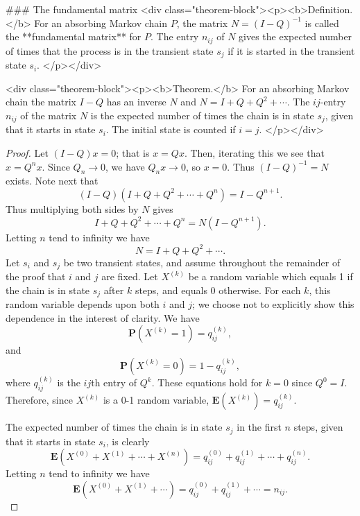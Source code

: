 ### The fundamental matrix
<div class="theorem-block"><p><b>Definition.</b> 
For an absorbing Markov chain $P$, the matrix $N = (I-Q)^{-1}$ is called the **fundamental matrix** for $P$. The entry $n_{ij}$ of $N$ gives the expected number of times that the process is in the transient state $s_j$ if it is started in the transient state $s_i$.
</p></div>

<div class="theorem-block"><p><b>Theorem.</b> 
For an absorbing Markov chain the matrix $I-Q$ has an inverse $N$ and $N = I + Q + Q^2 + \cdots$. The $ij$-entry $n_{ij}$ of the matrix $N$ is the expected number of times the chain is in state $s_j$, given that it starts in state $s_i$. The initial state is counted if $i = j$.
</p></div>

\begin{proof}
Let $(I-Q)x = 0$; that is $x = Qx$. Then, iterating this we see that $x = Q^n x$. Since $Q_n \to 0$, we have $Q_n x \to 0$, so $x = 0$. Thus $(I-Q)^{-1} = N$
exists. Note next that
$$\begin{equation}
    (I-Q)(I+Q + Q^2 + \cdots + Q^n) = I - Q^{n+1}.
\end{equation}$$
Thus multiplying both sides by $N$ gives
$$\begin{equation}
    I + Q + Q^2 + \cdots + Q^n = N(I-Q^{n+1}) .
\end{equation}$$
Letting $n$ tend to infinity we have
$$\begin{equation}
    N = I + Q + Q^2 + \cdots .
\end{equation}$$
Let $s_i$ and $s_j$ be two transient states, and assume throughout the remainder of the proof that $i$ and $j$ are fixed. Let $X^{(k)}$ be a random variable which equals 1 if the chain is in state $s_j$ after $k$ steps, and equals 0 otherwise. For each $k$, this random variable depends upon both $i$ and $j$; we choose not to explicitly show this dependence in the interest of clarity. We have
$$\begin{equation}
    \mathbf{P} \left(X^{(k)}=1\right)=q_{i j}^{(k)},
\end{equation}$$
and 
$$\begin{equation}
    \mathbf{P} \left(X^{(k)}=0\right)=1-q_{i j}^{(k)},
\end{equation}$$
where $q_{i j}^{(k)}$ is the $ij$th entry of $Q^k$. These equations hold for $k = 0$ since $Q^0 = I$. Therefore, since $X^{(k)}$ is a 0-1 random variable, $\mathbf{E}(X^{(k)}) = q_{i j}^{(k)}$.

The expected number of times the chain is in state $s_j$ in the first $n$ steps, given that it starts in state $s_i$, is clearly
$$\begin{equation}
    \mathbf{E}\left(X^{(0)}+X^{(1)}+\cdots+X^{(n)}\right)=q_{i j}^{(0)}+q_{i j}^{(1)}+\cdots+q_{i j}^{(n)}.
\end{equation}$$
Letting $n$ tend to infinity we have
$$\begin{equation}
    \mathbf{E}\left(X^{(0)}+X^{(1)}+\cdots\right)=q_{i j}^{(0)}+q_{i j}^{(1)}+\cdots=n_{i j}.
\end{equation}$$
\end{proof}



